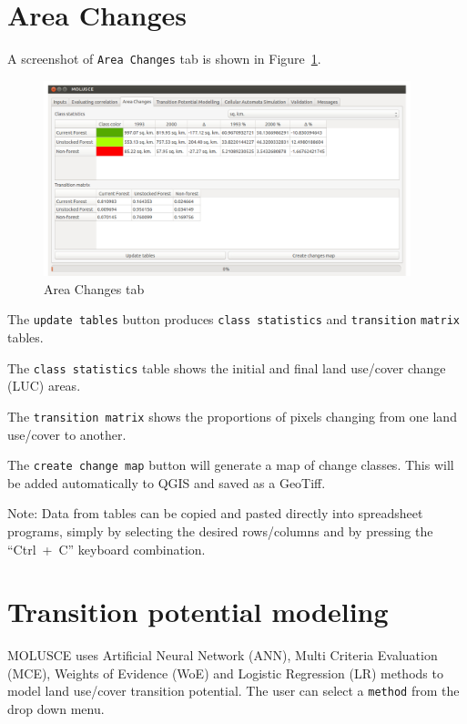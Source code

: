 \documentclass{report}
\begin{document}
\section{Area Changes}

A screenshot of \verb+Area Changes+ tab is shown in Figure~\ref{fig:changes_tab}.

\begin{figure}[h!]
\centering
\includegraphics[width=0.95\textwidth]{img/changes_tab.png}
\caption{Area Changes tab}
\label{fig:changes_tab}
\end{figure}

The \verb+update tables+ button produces \verb+class statistics+ and \verb+transition+ \verb+matrix+ tables.

The \verb+class statistics+ table shows the initial and final land use/cover change (LUC) areas.

The \verb+transition matrix+ shows the proportions of pixels changing from one land use/cover to another.

The \verb+create change map+ button will generate a map of change classes. This will be added
automatically to QGIS and saved as a GeoTiff.

Note: Data from tables can be copied and pasted directly into spreadsheet programs, simply by
selecting the desired rows/columns and by pressing the “Ctrl~+~C” keyboard combination.

\section{Transition potential modeling}
MOLUSCE uses Artificial Neural Network (ANN), Multi Criteria Evaluation (MCE), Weights of
Evidence (WoE) and Logistic Regression (LR) methods to model land use/cover transition
potential. The user can select a \verb+method+ from the drop down menu.
\end{document}
